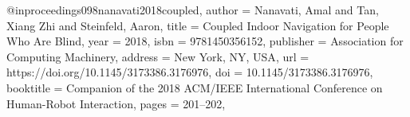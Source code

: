 @inproceedings{098nanavati2018coupled,
author = {Nanavati, Amal and Tan, Xiang Zhi and Steinfeld, Aaron},
title = {Coupled Indoor Navigation for People Who Are Blind},
year = {2018},
isbn = {9781450356152},
publisher = {Association for Computing Machinery},
address = {New York, NY, USA},
url = {https://doi.org/10.1145/3173386.3176976},
doi = {10.1145/3173386.3176976},
booktitle = {Companion of the 2018 ACM/IEEE International Conference on Human-Robot Interaction},
pages = {201–202},
}